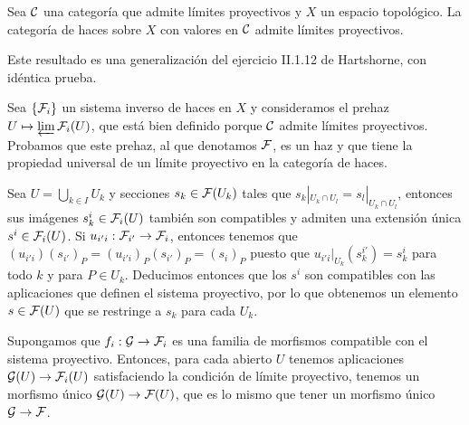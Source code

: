\documentclass[twoside]{article}
\begin{document}
\begin{prop}[EGA, 0-3.2.6]\label{limite}
Sea ${\mathcal C}$ una categoría que admite límites proyectivos y $X$ un espacio topológico. La categoría de haces sobre $X$ con valores en ${\mathcal C}$ admite límites proyectivos. 
\end{prop}
\begin{dem}
Este resultado es una generalización del ejercicio II.1.12 de Hartshorne, con idéntica prueba.

Sea $\{\mathcal{F}_i\}$ un sistema inverso de haces en $X$ y consideramos el prehaz $U\mapsto\varprojlim\mathcal{F}_i(U)$, que está bien definido porque ${\mathcal C}$ admite límites proyectivos. Probamos que este prehaz, al que denotamos $\mathcal{F}$, es un haz y que tiene la propiedad universal de un límite proyectivo en la categoría de haces. 

Sea $U=\bigcup_{k\in I} U_k$ y secciones $s_k\in\mathcal{F}(U_k)$ tales que $s_k|_{U_k\cap U_l}=s_l|_{U_k\cap U_l}$, entonces sus imágenes $s_k^i\in \mathcal{F}_i(U)$ también son compatibles y admiten una extensión única $s^i\in\mathcal{F}_i(U)$. Si $u_{i'i}:\mathcal{F}_{i'}\to\mathcal{F}_i$, entonces tenemos que $(u_{i'i})(s_{i'})_P=(u_{i'i})_P(s_{i'})_P=(s_i)_P$ puesto que $u_{i'i}|_{U_k}(s^{i'}_k)=s^i_k$ para todo $k$ y para $P\in U_k$. Deducimos entonces que los $s^i$ son compatibles con las aplicaciones que definen el sistema proyectivo, por lo que obtenemos un elemento $s\in\mathcal{F}(U)$ que se restringe a $s_k$ para cada $U_k$. 

Supongamos que $f_i:\mathcal{G}\to\mathcal{F}_i$ es una familia de morfismos compatible con el sistema proyectivo. Entonces, para cada abierto $U$ tenemos aplicaciones $\mathcal{G}(U)\to\mathcal{F}_i(U)$ satisfaciendo la condición de límite proyectivo, tenemos un morfismo único $\mathcal{G}(U)\to\mathcal{F}(U)$, que es lo mismo que tener un morfismo único $\mathcal{G}\to\mathcal{F}$. 

\end{dem}
\end{document}
